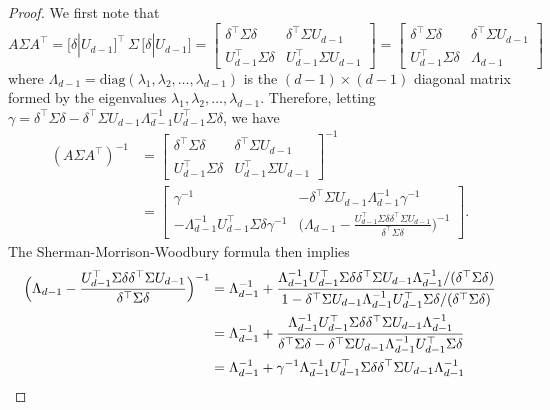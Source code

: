 \documentclass[11pt]{extarticle}
\begin{document}
\begin{proof}
We first note that
\begin{equation*}
A \Sigma A^{\top} = \bigl[ \delta | U_{d-1} \bigr]^{\top}\, \Sigma \, \bigl[ \delta | U_{d-1} \bigr] = \begin{bmatrix} \delta^{\top} \Sigma \delta & \delta^{\top} \Sigma U_{d-1} \\ U_{d-1}^{\top} \Sigma \delta & U_{d-1}^{\top} \Sigma U_{d-1} \end{bmatrix} = \begin{bmatrix} \delta^{\top} \Sigma \delta & \delta^{\top} \Sigma U_{d-1} \\ U_{d-1}^{\top} \Sigma \delta & \Lambda_{d-1} \end{bmatrix}
\end{equation*}
where $\Lambda_{d-1} = \mathrm{diag}(\lambda_1, \lambda_2, \dots, \lambda_{d-1})$ is the $(d-1) \times (d-1)$ diagonal matrix formed by the eigenvalues $\lambda_1, \lambda_2, \dots, \lambda_{d-1}$.
Therefore, letting $\gamma = \delta^{\top} \Sigma \delta - \delta^{\top} \Sigma U_{d-1} \Lambda_{d-1}^{-1} U_{d-1}^{\top} \Sigma \delta$, we have
\begin{equation*}
\begin{split}
(A \Sigma A^{\top})^{-1} &= \begin{bmatrix} \delta^{\top} \Sigma \delta & \delta^{\top} \Sigma U_{d-1} \\ U_{d-1}^{\top} \Sigma \delta & U_{d-1}^{\top} \Sigma U_{d-1} \end{bmatrix}^{-1} \\
&= \begin{bmatrix} \gamma^{-1} & - \delta^{\top} \Sigma U_{d-1} \Lambda_{d-1}^{-1} \gamma^{-1} \\
- \Lambda_{d-1}^{-1} U_{d-1}^{\top} \Sigma \delta \gamma^{-1} & \bigl(\Lambda_{d-1} - \frac{U_{d-1}^{\top} \Sigma \delta \delta^{\top} \Sigma U_{d-1}}{\delta^{\top} \Sigma \delta} \bigr)^{-1} \end{bmatrix}.
\end{split}
\end{equation*}
The Sherman-Morrison-Woodbury formula then implies
\begin{equation*}
\begin{split}
\Bigl(\Lambda_{d-1} - \frac{U_{d-1}^{\top} \Sigma \delta \delta^{\top} \Sigma U_{d-1}}{\delta^{\top} \Sigma \delta} \Bigr)^{-1} & = \Lambda_{d-1}^{-1} + \frac{\Lambda_{d-1}^{-1} U_{d-1}^{\top} \Sigma \delta \delta^{\top} \Sigma U_{d-1} \Lambda_{d-1}^{-1} /(\delta^{\top} \Sigma \delta)}{1 - \delta^{\top} \Sigma U_{d-1} \Lambda_{d-1}^{-1} U_{d-1}^{\top} \Sigma \delta/(\delta^{\top} \Sigma \delta)} \\
&= \Lambda_{d-1}^{-1} + \frac{\Lambda_{d-1}^{-1} U_{d-1}^{\top} \Sigma \delta \delta^{\top} \Sigma U_{d-1} \Lambda_{d-1}^{-1}}{\delta^{\top} \Sigma \delta - \delta^{\top} \Sigma U_{d-1} \Lambda_{d-1}^{-1} U_{d-1}^{\top} \Sigma \delta} \\
&= \Lambda_{d-1}^{-1} + \gamma^{-1} \Lambda_{d-1}^{-1} U_{d-1}^{\top} \Sigma \delta \delta^{\top} \Sigma U_{d-1} \Lambda_{d-1}^{-1}
\end{split}
\end{equation*}


\end{proof}
\end{document}
